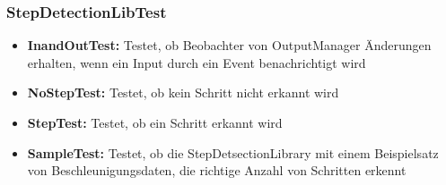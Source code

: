\documentclass[../validierung.tex]{subfiles}
\begin{document}
\subsubsection{StepDetectionLibTest}
\begin{itemize}
\item \textbf{InandOutTest:} Testet, ob Beobachter von OutputManager Änderungen erhalten, wenn ein Input durch ein Event benachrichtigt wird
\item \textbf{NoStepTest:} Testet, ob kein Schritt nicht erkannt wird
\item \textbf{StepTest:} Testet, ob ein Schritt erkannt wird
\item \textbf{SampleTest:} Testet, ob die StepDetsectionLibrary mit einem Beispielsatz von Beschleunigungsdaten, die richtige Anzahl von Schritten erkennt
\end{itemize}
\end{document}
